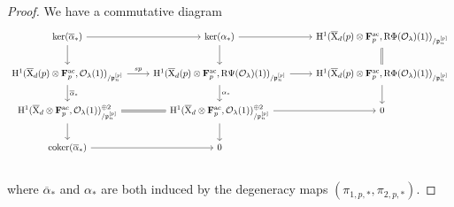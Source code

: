 \documentclass[10pt,a4paper]{amsart}
\def\FF{\mathbf{F}}
\def\ac{\mathrm{ac}}
\def\calO{\mathcal{O}}
\def\coker{\mathrm{coker}}
\def\frakp{\mathfrak{p}}
\def\rmH{\mathrm{H}}
\def\rmR{\mathrm{R}}
\def\rmX{\mathrm{X}}
\begin{document}
\begin{proof}
We have a commutative diagram
\begin{equation}\label{dia1}
\begin{tikzcd}
\ker(\overline{\alpha}_{\ast}) \arrow[d] \arrow[r]            &\ker({\alpha}_{\ast})   \arrow[d] \arrow[r]          &   \rmH^{1}(\overline{\rmX}_{d}(p)\otimes{\FF^{\ac}_{p}}, \rmR\Phi(\calO_{\lambda})(1))_{/\frakp^{[p]}_{n}}    \arrow[d, Rightarrow, no head]       \\
\rmH^{1}(\overline{\rmX}_{d}(p)\otimes{\FF^{\ac}_{p}}, \calO_{\lambda}(1))_{/\frakp^{[p]}_{n}} \arrow[r, "sp"] \arrow[d, "\overline{\alpha}_{\ast}"]      & \rmH^{1}(\overline{\rmX}_{d}(p)\otimes{\FF^{\ac}_{p}}, \rmR\Psi(\calO_{\lambda})(1))_{/\frakp^{[p]}_{n}} \arrow[r] \arrow[d, "\alpha_{\ast}"] & \rmH^{1}(\overline{\rmX}_{d}(p)\otimes{\FF^{\ac}_{p}}, \rmR\Phi(\calO_{\lambda})(1))_{/\frakp^{[p]}_{n}} \arrow[d] \\
\rmH^{1}(\overline{\rmX}_{d}\otimes{\FF^{\ac}_{p}}, \calO_{\lambda}(1))^{\oplus 2}_{/\frakp^{[p]}_{n}}\arrow[r, Rightarrow, no head]\arrow[d] & \rmH^{1}(\overline{\rmX}_{d}\otimes {\FF^{\ac}_{p}}, \calO_{\lambda}(1))^{\oplus 2}_{/\frakp^{[p]}_{n}}\arrow[r] \arrow[d]     & 0      \\
\coker(\overline{\alpha}_{\ast})\arrow[r] &0\\    
\end{tikzcd}
\end{equation}
where $\overline{\alpha}_{\ast}$ and $\alpha_{\ast}$ are both induced by the degeneracy maps $(\pi_{1,p,\ast}, \pi_{2,p,\ast})$. 


\end{proof}
\end{document}
